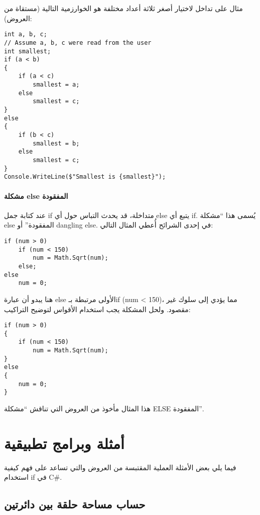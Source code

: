 ﻿\documentclass[12pt]{article}
\begin{document}
مثال على تداخل لاختيار أصغر ثلاثة أعداد مختلفة هو الخوارزمية التالية (مستقاة من العروض):


\begin{english}
\begin{verbatim}
int a, b, c;
// Assume a, b, c were read from the user
int smallest;
if (a < b)
{
    if (a < c)
        smallest = a;
    else
        smallest = c;
}
else
{
    if (b < c)
        smallest = b;
    else
        smallest = c;
}
Console.WriteLine($"Smallest is {smallest}");
\end{verbatim}
\end{english}

\paragraph{مشكلة \textenglish{else} المفقودة} عند كتابة جمل \textenglish{if} متداخلة، قد يحدث التباس حول أي \textenglish{else} يتبع أي \textenglish{if}. يُسمى هذا ``مشكلة \textenglish{else} المفقودة'' أو \textenglish{dangling else}. في إحدى الشرائح أُعطي المثال التالي:

\begin{english}
\begin{verbatim}
if (num > 0)
    if (num < 150)
        num = Math.Sqrt(num);
    else;
else
    num = 0;
\end{verbatim}
\end{english}

هنا يبدو أن عبارة \textenglish{else} الأولى مرتبطة بـ\textenglish{if (num < 150)}، مما يؤدي إلى سلوك غير مقصود. ولحل المشكلة يجب استخدام الأقواس لتوضيح التراكيب:

\begin{english}
\begin{verbatim}
if (num > 0)
{
    if (num < 150)
        num = Math.Sqrt(num);
}
else
{
    num = 0;
}
\end{verbatim}
\end{english}

هذا المثال مأخوذ من العروض التي تناقش ``مشكلة \textenglish{ELSE} المفقودة''.

\section{أمثلة وبرامج تطبيقية}

فيما يلي بعض الأمثلة العملية المقتبسة من العروض والتي تساعد على فهم كيفية استخدام \textenglish{if} في C\#.

\subsection{حساب مساحة حلقة بين دائرتين}
\end{document}
